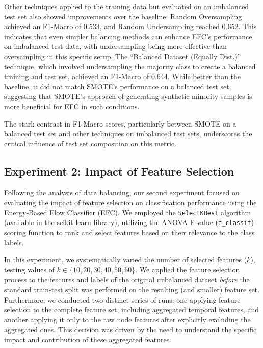 \documentclass[12pt]{article}
\begin{document}
Other techniques applied to the training data but evaluated on an imbalanced test set
also showed improvements over the baseline: Random Oversampling achieved an F1-Macro of 0.533, and Random Undersampling
reached 0.652. This indicates that even simpler balancing methods can enhance EFC's performance on imbalanced test data,
with undersampling being more effective than oversampling in this specific setup. The ``Balanced Dataset (Equally Dist.)''
technique, which involved undersampling the majority class to create a balanced training and test set, achieved an F1-Macro
of 0.644. While better than the baseline, it did not match SMOTE's performance on a balanced test set, suggesting that
SMOTE's approach of generating synthetic minority samples is more beneficial for EFC in such conditions. 

\begin{highlightbox}
The stark contrast in F1-Macro scores, particularly between SMOTE on a balanced test set and other techniques on imbalanced
test sets, underscores the critical influence of test set composition on this metric.
\end{highlightbox}

\subsection{Experiment 2: Impact of Feature Selection} \label{subsec:experiment_2}

Following the analysis of data balancing, our second experiment focused on evaluating the impact of feature selection on
classification performance using the Energy-Based Flow Classifier (EFC). We employed the \texttt{SelectKBest} algorithm
(available in the scikit-learn library), utilizing the ANOVA F-value (\texttt{f\_classif}) scoring function to rank and
select features based on their relevance to the class labels. 

In this experiment, we systematically varied the number of selected features ($k$), testing values of $k \in \{10, 20, 30,
40, 50, 60\}$. We applied the feature selection process to the features and labels of the original unbalanced dataset
\textit{before} the standard train-test split was performed on the resulting (and smaller) feature set. Furthermore, we
conducted two distinct series of runs: one applying feature selection to the complete feature set, including aggregated
temporal features, and another applying it only to the raw node features after explicitly excluding the aggregated ones.
This decision was driven by the need to understand the specific impact and contribution of these aggregated features. 
\end{document}
